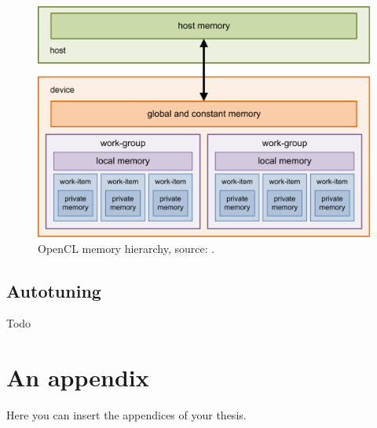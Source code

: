 \documentclass[
  digital,     %
  oneside,     %
  nosansbold,  %
  nocolorbold, %
  lof,         %
  lot,         %
]{fithesis4}
\begin{document}
\begin{figure}
    \begin{center}
    \includegraphics[width=125mm]{Figures/OpenClHierarchy.png}
    \end{center}
    \caption{OpenCL memory hierarchy, source: \cite{opencl-hierarchy-diagram}.}
    \label{opencl-hierarchy}
\end{figure}

\section{Autotuning}
Todo




\appendix %
\chapter{An appendix}
Here you can insert the appendices of your thesis.
\end{document}
